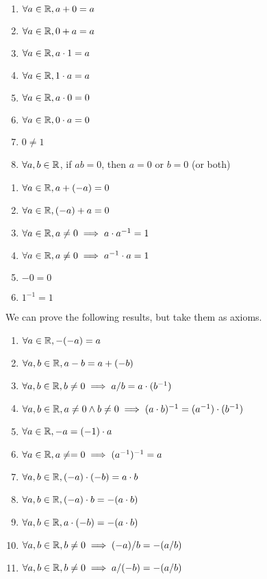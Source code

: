 \begin{enumerate}[resume*]
\item $\forall a\in\mathbb{R}, a+0=a$
\item $\forall a\in\mathbb{R}, 0+a=a$
\item $\forall a\in\mathbb{R}, a\cdot1=a$
\item $\forall a\in\mathbb{R}, 1\cdot a=a$
\item $\forall a\in\mathbb{R}, a\cdot0=0$
\item $\forall a\in\mathbb{R}, 0\cdot a=0$
\item $0\neq1$
\item $\forall a,b\in\mathbb{R}$, if $ab=0$, then $a=0$ or $b=0$ (or both)
\end{enumerate}


\begin{enumerate}[resume*]
\item $\forall a\in\mathbb{R}, a+(-a)=0$
\item $\forall a\in\mathbb{R}, (-a)+a=0$
\item $\forall a\in\mathbb{R}, a\neq0\implies a\cdot a^{-1} = 1$
\item $\forall a\in\mathbb{R}, a\neq0\implies a^{-1}\cdot a = 1$
\item $-0=0$
\item $1^{-1}=1$
\end{enumerate}

\M We can prove the following results, but take them as axioms.
\begin{enumerate}[resume*]
\item $\forall a\in\mathbb{R}, -(-a)=a$
\item $\forall a,b\in\mathbb{R}, a-b = a+(-b)$
\item $\forall a,b\in\mathbb{R}, b\neq0\implies a/b=a\cdot(b^{-1})$
\item $\forall a,b\in\mathbb{R}, a\neq0\land b\neq0\implies (a\cdot b)^{-1}=(a^{-1})\cdot(b^{-1})$
\item $\forall a\in\mathbb{R}, -a = (-1)\cdot a$
\item $\forall a\in\mathbb{R}, a\neq=0\implies (a^{-1})^{-1}=a$
\item $\forall a,b\in\mathbb{R}, (-a)\cdot(-b)=a\cdot b$
\item $\forall a,b\in\mathbb{R}, (-a)\cdot b=-(a\cdot b)$
\item $\forall a,b\in\mathbb{R}, a\cdot(-b)=-(a\cdot b)$
\item $\forall a,b\in\mathbb{R}, b\neq0\implies (-a)/b=-(a/b)$
\item $\forall a,b\in\mathbb{R}, b\neq0\implies a/(-b)=-(a/b)$
\end{enumerate}

